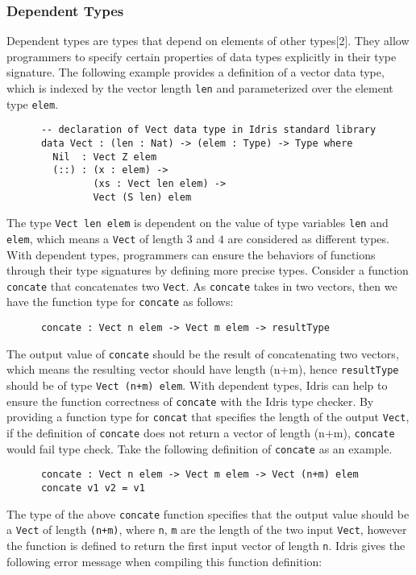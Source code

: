 \subsubsection*{Dependent Types}
Dependent types are types that depend on elements of other types[2]. They allow programmers to specify certain properties of data types explicitly in their type signature. The following example provides a definition of a vector data type, which is indexed by the vector length \texttt{len} and parameterized over the element type \texttt{elem}.
\begin{lstlisting}
      -- declaration of Vect data type in Idris standard library
      data Vect : (len : Nat) -> (elem : Type) -> Type where
        Nil  : Vect Z elem
        (::) : (x : elem) -> 
               (xs : Vect len elem) -> 
               Vect (S len) elem
\end{lstlisting}
The type \texttt{Vect len elem} is dependent on the value of type variables \texttt{len} and \texttt{elem}, which means a \texttt{Vect} of length $3$ and $4$ are considered as different types. With dependent types, programmers can ensure the behaviors of functions through their type signatures by defining more precise types. Consider a function \texttt{concate} that concatenates two \texttt{Vect}. As \texttt{concate} takes in two vectors, then we have the function type for \texttt{concate} as follows: 
\begin{lstlisting}
      concate : Vect n elem -> Vect m elem -> resultType
\end{lstlisting}
The output value of \texttt{concate} should be the result of concatenating two vectors, which means the resulting vector should have length (n+m), hence \texttt{resultType} should be of type \texttt{Vect (n+m) elem}. With dependent types, Idris can help to ensure the function correctness of \texttt{concate} with the Idris type checker. By providing a function type for \texttt{concat} that specifies the length of the output \texttt{Vect}, if the definition of \texttt{concate} does not return a vector of length (n+m), \texttt{concate} would fail type check. Take the following definition of \texttt{concate} as an example. 
\begin{lstlisting}
      concate : Vect n elem -> Vect m elem -> Vect (n+m) elem
      concate v1 v2 = v1
\end{lstlisting}
The type of the above \texttt{concate} function specifies that the output value should be a \texttt{Vect} of length \texttt{(n+m)}, where \texttt{n}, \texttt{m} are the length of the two input \texttt{Vect}, however the function is defined to return the first input vector of length \texttt{n}. Idris gives the following error message when compiling this function definition: 
